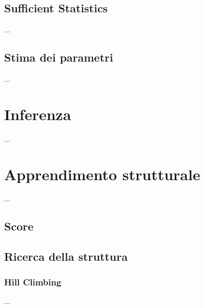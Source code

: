 \subsection{Sufficient Statistics}
...

\subsection{Stima dei parametri}
...

\section{Inferenza}
\label{sec:ctbn-inferenza}
...


\section{Apprendimento strutturale}
\label{sec:ctbn-apprendimento-strutturale}
...

\subsection{Score} %
\label{sec:ctbn-score}

\subsection{Ricerca della struttura}
\label{sec:ctbn-graph-search}

\subsubsection{Hill Climbing}
...





